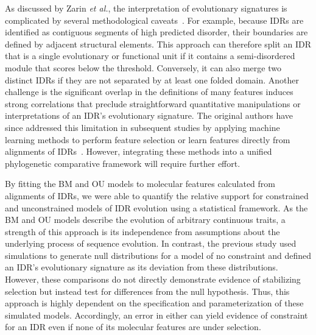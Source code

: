 As discussed by Zarin \textit{et al.}, the interpretation of evolutionary signatures is complicated by several methodological caveats~\cite{Zarin2019}. For example, because IDRs are identified as contiguous segments of high predicted disorder, their boundaries are defined by adjacent structural elements. This approach can therefore split an IDR that is a single evolutionary or functional unit if it contains a semi-disordered module that scores below the threshold. Conversely, it can also merge two distinct IDRs if they are not separated by at least one folded domain. Another challenge is the significant overlap in the definitions of many features induces strong correlations that preclude straightforward quantitative manipulations or interpretations of an IDR's evolutionary signature. The original authors have since addressed this limitation in subsequent studies by applying machine learning methods to perform feature selection or learn features directly from alignments of IDRs~\cite{Zarin2021, Lu2022}. However, integrating these methods into a unified phylogenetic comparative framework will require further effort.

By fitting the BM and OU models to molecular features calculated from alignments of IDRs, we were able to quantify the relative support for constrained and unconstrained models of IDR evolution using a statistical framework. As the BM and OU models describe the evolution of arbitrary continuous traits, a strength of this approach is its independence from assumptions about the underlying process of sequence evolution. In contrast, the previous study used simulations to generate null distributions for a model of no constraint and defined an IDR's evolutionary signature as its deviation from these distributions. However, these comparisons do not directly demonstrate evidence of stabilizing selection but instead test for differences from the null hypothesis. Thus, this approach is highly dependent on the specification and parameterization of these simulated models. Accordingly, an error in either can yield evidence of constraint for an IDR even if none of its molecular features are under selection.

